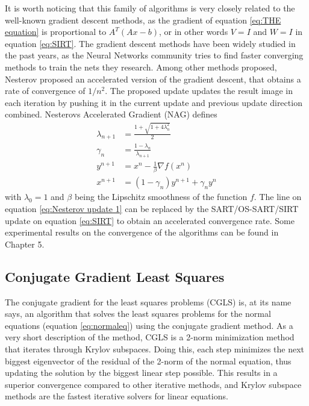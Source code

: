 It is worth noticing that this family of algorithms is very closely related to the well-known gradient descent methods, as the gradient of equation \ref{eq:THE equation} is  proportional to $A^T(Ax-b)$, or in other words $V=I$ and $W=I$ in equation \ref{eq:SIRT}. The gradient descent methods have been widely studied in the past years\cite{sutskever2013importance}\cite{DBLP:journals/corr/Ruder16}, as the Neural Networks community tries to find faster converging methods to train the nets they research. Among other methods proposed, Nesterov proposed an accelerated version of the gradient descent\cite{nesterov1983method}, that obtains a rate of convergence of $1/n^2$. The proposed update updates the result image in each iteration by pushing it in the current update and previous update direction combined. Nesterovs Accelerated Gradient (NAG) defines
\begin{align}
\lambda_{n+1}&=\frac{1+\sqrt{1+4\lambda_{n}^2}}{2}\\
\gamma_n&=\frac{1-\lambda_n}{\lambda_{n+1}}\\
y^{n+1}&=x^{n}-\frac{1}{\beta}\nabla f(x^n)\label{eq:Nesterov update 1}\\ 
x^{n+1}&=(1-\gamma_n)y^{n+1}+\gamma_n y^n
\end{align}
with $\lambda_0=1$ and $\beta$ being the Lipschitz smoothness of the function $f$. The line on equation \ref{eq:Nesterov update 1} can be replaced by the SART/OS-SART/SIRT update on equation \ref{eq:SIRT} to obtain an accelerated convergence rate. Some experimental results on the convergence of the algorithms can be found in Chapter 5.
\subsection{Conjugate Gradient Least Squares}

The conjugate gradient for the least squares problems (CGLS) is, at its name says, an algorithm that solves the least squares problems for the normal equations (equation \ref{eq:normaleq}) using the conjugate gradient method. As a very short description of the method, CGLS is a 2-norm minimization method that iterates through Krylov subspaces. Doing this, each step minimizes the next biggest eigenvector of the residual of the 2-norm of the normal equation, thus updating the solution by the biggest linear step possible. This results in a superior convergence compared to other iterative methods\cite{liesen2004convergence}, and Krylov subspace methods are the fastest iterative solvers for linear equations. 

